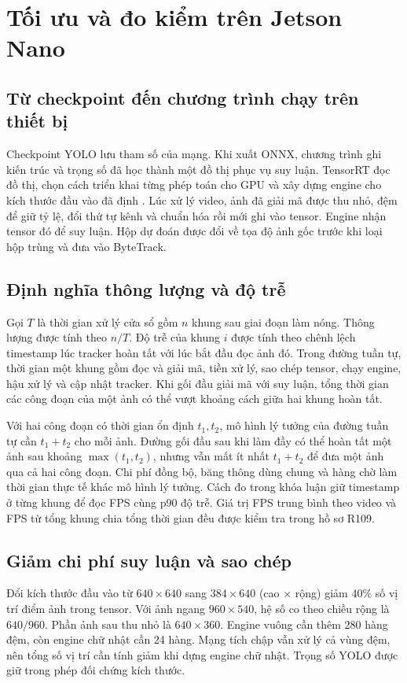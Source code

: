 \chapter{Tối ưu và đo kiểm trên Jetson Nano}\label{chap:nano}
\section{Từ checkpoint đến chương trình chạy trên thiết bị}
Checkpoint YOLO lưu tham số của mạng. Khi xuất ONNX, chương trình ghi kiến trúc và trọng số đã học thành một đồ thị phục vụ suy luận. TensorRT đọc đồ thị, chọn cách triển khai từng phép toán cho GPU và xây dựng engine cho kích thước đầu vào đã định \cite{tensorrt}. Lúc xử lý video, ảnh đã giải mã được thu nhỏ, đệm để giữ tỷ lệ, đổi thứ tự kênh và chuẩn hóa rồi mới ghi vào tensor. Engine nhận tensor đó để suy luận. Hộp dự đoán được đổi về tọa độ ảnh gốc trước khi loại hộp trùng và đưa vào ByteTrack.

\section{Định nghĩa thông lượng và độ trễ}
Gọi $T$ là thời gian xử lý cửa sổ gồm $n$ khung sau giai đoạn làm nóng. Thông lượng được tính theo $n/T$. Độ trễ của khung $i$ được tính theo chênh lệch timestamp lúc tracker hoàn tất với lúc bắt đầu đọc ảnh đó. Trong đường tuần tự, thời gian một khung gồm đọc và giải mã, tiền xử lý, sao chép tensor, chạy engine, hậu xử lý và cập nhật tracker. Khi gối đầu giải mã với suy luận, tổng thời gian các công đoạn của một ảnh có thể vượt khoảng cách giữa hai khung hoàn tất.

Với hai công đoạn có thời gian ổn định $t_1,t_2$, mô hình lý tưởng của đường tuần tự cần $t_1+t_2$ cho mỗi ảnh. Đường gối đầu sau khi làm đầy có thể hoàn tất một ảnh sau khoảng $\max(t_1,t_2)$, nhưng vẫn mất ít nhất $t_1+t_2$ để đưa một ảnh qua cả hai công đoạn. Chi phí đồng bộ, băng thông dùng chung và hàng chờ làm thời gian thực tế khác mô hình lý tưởng. Cách đo trong khóa luận giữ timestamp ở từng khung để đọc FPS cùng p90 độ trễ. Giá trị FPS trung bình theo video và FPS từ tổng khung chia tổng thời gian đều được kiểm tra trong hồ sơ R109.

\section{Giảm chi phí suy luận và sao chép}
Đổi kích thước đầu vào từ $640\times640$ sang $384\times640$ (cao $\times$ rộng) giảm 40\% số vị trí điểm ảnh trong tensor. Với ảnh ngang $960\times540$, hệ số co theo chiều rộng là $640/960$. Phần ảnh sau thu nhỏ là $640\times360$. Engine vuông cần thêm 280 hàng đệm, còn engine chữ nhật cần 24 hàng. Mạng tích chập vẫn xử lý cả vùng đệm, nên tổng số vị trí cần tính giảm khi dựng engine chữ nhật. Trọng số YOLO được giữ trong phép đối chứng kích thước.

